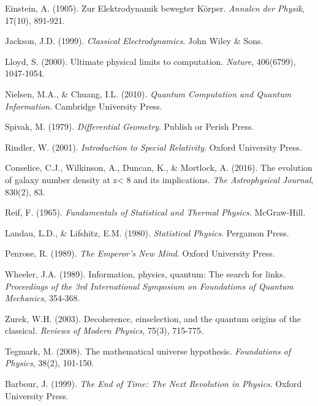 \documentclass[12pt,a4paper]{article}
\begin{document}

\begin{thebibliography}{99}

Einstein, A. (1905). Zur Elektrodynamik bewegter Körper. \textit{Annalen der Physik}, 17(10), 891-921.

Jackson, J.D. (1999). \textit{Classical Electrodynamics}. John Wiley \& Sons.

Lloyd, S. (2000). Ultimate physical limits to computation. \textit{Nature}, 406(6799), 1047-1054.

Nielsen, M.A., \& Chuang, I.L. (2010). \textit{Quantum Computation and Quantum Information}. Cambridge University Press.

Spivak, M. (1979). \textit{Differential Geometry}. Publish or Perish Press.

Rindler, W. (2001). \textit{Introduction to Special Relativity}. Oxford University Press.

Conselice, C.J., Wilkinson, A., Duncan, K., \& Mortlock, A. (2016). The evolution of galaxy number density at z< 8 and its implications. \textit{The Astrophysical Journal}, 830(2), 83.

Reif, F. (1965). \textit{Fundamentals of Statistical and Thermal Physics}. McGraw-Hill.

Landau, L.D., \& Lifshitz, E.M. (1980). \textit{Statistical Physics}. Pergamon Press.

Penrose, R. (1989). \textit{The Emperor's New Mind}. Oxford University Press.

Wheeler, J.A. (1989). Information, physics, quantum: The search for links. \textit{Proceedings of the 3rd International Symposium on Foundations of Quantum Mechanics}, 354-368.

Zurek, W.H. (2003). Decoherence, einselection, and the quantum origins of the classical. \textit{Reviews of Modern Physics}, 75(3), 715-775.

Tegmark, M. (2008). The mathematical universe hypothesis. \textit{Foundations of Physics}, 38(2), 101-150.

Barbour, J. (1999). \textit{The End of Time: The Next Revolution in Physics}. Oxford University Press.


\end{thebibliography}
\end{document}
